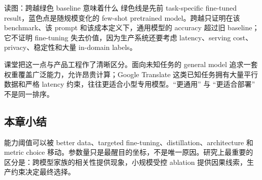 
\begin{knowledgebox}{读图：跨越绿色 baseline 意味着什么}
绿色线是先前 task-specific fine-tuned result，蓝色点是随规模变化的 few-shot pretrained model。跨越只证明在该 benchmark、该 prompt 和该成本定义下，通用模型的 accuracy 超过旧 baseline；它不证明 fine-tuning 失去价值，因为生产系统还要考虑 latency、serving cost、privacy、稳定性和大量 in-domain labels。
\end{knowledgebox}

课堂把这一点与产品工程作了清晰区分。面向未知任务的 general model 追求一套权重覆盖广泛能力，允许昂贵计算；Google Translate 这类已知任务拥有大量平行数据和严格 latency 约束，往往更适合小型专用模型。``更通用'' 与 ``更适合部署'' 不是同一排序。

\subsection{本章小结}

能力阈值可以被 better data、targeted fine-tuning、distillation、architecture 和 metric choice 移动。参数量只是最醒目的坐标，不是唯一原因。研究上最重要的区分是：跨模型家族的相关性提供现象，小规模受控 ablation 提供因果线索，生产约束决定最终选择。

